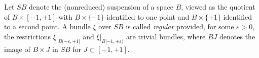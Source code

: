 Let $SB$ denote the (nonreduced) suspension of a space $B$, viewed as the quotient of $B \times [-1, +1]$ with $B \times \{-1\}$ identified to one point and $B \times \{+1\}$ identified to a second point. A bundle $\xi$ over $SB$ is called \emph{regular} provided, for some $\varepsilon > 0$, the restrictions $\xi|_{B(-\varepsilon, +1]}$ and $\xi|_{B[-1, +\varepsilon)}$ are trivial bundles, where $BJ$ denotes the image of $B \times J$ in $SB$ for $J \subset [-1, +1]$.
